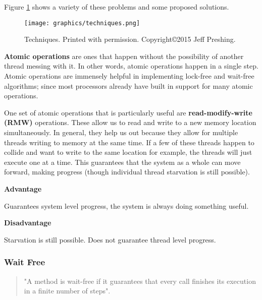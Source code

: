 \documentclass[letterpaper, 11pt]{article}
\begin{document}
Figure \ref{techniques} shows a variety of these problems and some proposed solutions.
\begin{figure}
  \centering
  \texttt{[image: graphics/techniques.png]}
  \caption{Techniques. Printed with permission. Copyright\copyright 2015 Jeff Preshing.\cite{introlockfree}}
  \label{techniques}
\end{figure} 
\newpage

{\bfseries Atomic operations} are ones that happen without the possibility of another thread 
messing with it. In other words, atomic operations happen in a single step. Atomic operations 
are immensely helpful in implementing lock-free and wait-free algorithms; since most 
processors already have built in support for many atomic operations. 
\par\vspace{\baselineskip}

One set of atomic operations that is particularly useful are {\bfseries read-modify-write (RMW)} 
operations. These allow us to read and write to a new memory location simultaneously. In general, 
they help us out because they allow for multiple threads writing to memory at the same time. 
If a few of these threads happen to collide and want to write to the same location for example, 
the threads will just execute one at a time. This guarantees that the system as a whole can move 
forward, making progress (though individual thread starvation is still possible).  
\par\vspace{\baselineskip}


{\bfseries Advantage} \par\vspace{\baselineskip}
Guarantees system level progress, the system is always doing something useful.
\par\vspace{\baselineskip}

{\bfseries Disadvantage} 
\par\vspace{\baselineskip}
Starvation is still possible. Does not guarantee thread level progress. 


\subsubsection{Wait Free}
\begin{quotation}
	"A method is wait-free if it guarantees that every call finishes its execution
	in a finite number of steps"\citep[p. 59]{artofmulti}.
\end{quotation}
\end{document}
